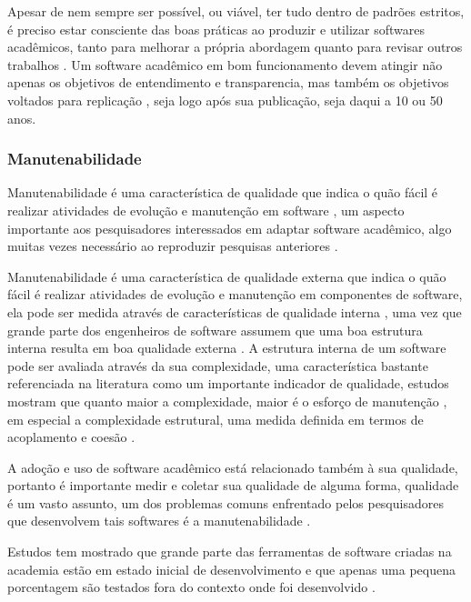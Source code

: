 Apesar de nem sempre ser possível, ou viável, ter tudo dentro de padrões
estritos, é preciso estar consciente das boas práticas ao produzir e utilizar
softwares acadêmicos, tanto para melhorar a própria abordagem quanto para
revisar outros trabalhos \cite{wilson2014best}. Um software acadêmico em bom
funcionamento devem atingir não apenas os objetivos de entendimento e
transparencia, mas também os objetivos voltados para replicação
\cite{stodden2010reproducible}, seja logo após sua publicação, seja daqui a 10 ou 50 anos.

\subsubsection{Manutenabilidade}


Manutenabilidade é uma característica de qualidade que indica o quão fácil é
realizar atividades de evolução e manutenção em software
\cite{kumar2012survey}, um aspecto importante aos pesquisadores interessados em
adaptar software acadêmico, algo muitas vezes necessário ao reproduzir
pesquisas anteriores \cite{peng2011reproducible}.

Manutenabilidade é uma característica de qualidade externa que indica o quão
fácil é realizar atividades de evolução e manutenção em componentes de
software, ela pode ser medida através de características de qualidade interna
\cite{hashim1996software, dagpinar2003predicting}, uma vez que grande parte dos
engenheiros de software assumem que uma boa estrutura interna resulta em boa
qualidade externa \cite{fenton2014software}.
A estrutura interna de um software pode ser avaliada através da sua
complexidade, uma característica bastante referenciada na literatura como um
importante indicador de qualidade, estudos mostram que quanto maior a
complexidade, maior é o esforço de manutenção \cite{hashim1996software,
darcy2005structural}, em especial a complexidade estrutural, uma medida definida em
termos de acoplamento e coesão \cite{terceiro2012caracterizacao}.

A adoção e uso de software acadêmico está relacionado também à sua qualidade,
portanto é importante medir e coletar sua qualidade de alguma forma, qualidade
é um vasto assunto, um dos problemas comuns enfrentado pelos pesquisadores que
desenvolvem tais softwares é a manutenabilidade \cite{prlic2012ten}.

Estudos tem mostrado que grande parte das ferramentas de software criadas na
academia estão em estado inicial de desenvolvimento \cite{marshall2013tools} e
que apenas uma pequena porcentagem são testados fora do contexto onde foi
desenvolvido \cite{portillo2012tools}.


